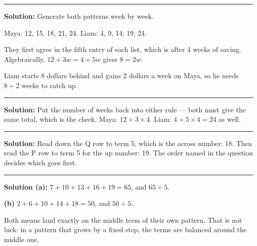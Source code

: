 \documentclass[12pt]{article}
\begin{document}
\vspace{0.15cm}\noindent\rule{\linewidth}{0.2pt}\vspace{0.15cm}


\textbf{Solution:} Generate both patterns week by week.

Maya: 12, 15, 18, 21, 24. \quad Liam: 4, 9, 14, 19, 24.

They first agree in the fifth entry of each list, which is after 4 weeks of saving. Algebraically, $12 + 3w = 4 + 5w$ gives $8 = 2w$. 

Liam starts 8 dollars behind and gains 2 dollars a week on Maya, so he needs $8 \div 2$ weeks to catch up.

\vspace{0.15cm}\noindent\rule{\linewidth}{0.2pt}\vspace{0.15cm}


\textbf{Solution:} Put the number of weeks back into either rule --- both must give the same total, which is the check. Maya: $12 + 3 \times 4$. Liam: $4 + 5 \times 4 = 24$ as well. 

\vspace{0.15cm}\noindent\rule{\linewidth}{0.2pt}\vspace{0.15cm}


\textbf{Solution:} Read down the Q row to term 5, which is the across number: 18. Then read the P row to term 5 for the up number: 19. The order named in the question decides which goes first. 

\vspace{0.15cm}\noindent\rule{\linewidth}{0.2pt}\vspace{0.15cm}


\textbf{Solution (a):} $7 + 10 + 13 + 16 + 19 = 65$, and $65 \div 5$. 

\textbf{(b)} $2 + 6 + 10 + 14 + 18 = 50$, and $50 \div 5$. 

Both means land exactly on the middle term of their own pattern. That is not luck: in a pattern that grows by a fixed step, the terms are balanced around the middle one.
\end{document}
